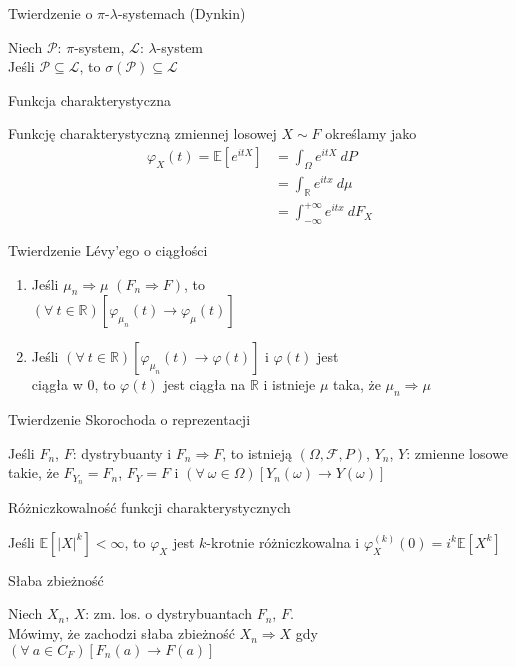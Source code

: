 \documentclass[avery5371,grid,frame]{flashcards}
\begin{document}
\begin{flashcard}[Twierdzenie]{Twierdzenie o $\pi$-$\lambda$-systemach (Dynkin)}

\smallskip
Niech $\mathcal{P}$: $\pi$-system, $\mathcal{L}$: $\lambda$-system \\
Jeśli $\mathcal{P} \subseteq \mathcal{L}$, to $\sigma(\mathcal{P}) \subseteq \mathcal{L}$
\end{flashcard}

\begin{flashcard}[Definicja]{Funkcja charakterystyczna}

\smallskip
Funkcję charakterystyczną zmiennej losowej $X \sim F$ określamy jako
{\begin{align*}
\varphi_X(t) = \mathbb{E} \left[ e^{itX} \right] &= \int_{\Omega} e^{itX} \ dP \\
             &= \int_{\mathbb{R}} e^{itx} \ d \mu \\
             &= \int_{-\infty}^{+\infty} e^{itx} \ dF_X 
\end{align*}}
\end{flashcard}

\begin{flashcard}[Twierdzenie]{Twierdzenie Lévy'ego o ciągłości}

\smallskip
\begin{enumerate}
\item Jeśli $\mu_n \Rightarrow \mu$ $(F_n \Rightarrow F)$, to \\ 
$(\forall \ t \in \mathbb{R})\left[\varphi_{\mu_n}(t) \rightarrow \varphi_\mu(t) \right]$
\item Jeśli $(\forall \ t \in \mathbb{R})\left[\varphi_{\mu_n}(t) \rightarrow \varphi(t) \right]$ i $\varphi(t)$ jest \\ ciągła w $0$, to $\varphi(t)$ jest ciągła na $\mathbb{R}$ i istnieje $\mu$ taka, że $\mu_n \Rightarrow \mu$
\end{enumerate}
\end{flashcard}

\begin{flashcard}[Twierdzenie]{Twierdzenie Skorochoda o reprezentacji}

\smallskip
Jeśli $F_n$, $F$: dystrybuanty i $F_n \Rightarrow F$, to istnieją $\left( \Omega, \mathcal{F}, P \right)$, $Y_n$, $Y$: zmienne losowe takie, że $F_{Y_n} = F_n$, $F_Y=F$ i $(\forall \ \omega \in \Omega)[Y_n(\omega) \rightarrow Y(\omega)]$
\end{flashcard}

\begin{flashcard}[Twierdzenie]{Różniczkowalność funkcji charakterystycznych}

\smallskip
Jeśli $\mathbb{E} \left[ |X|^k \right] < \infty$, to $\varphi_X$ jest $k$-krotnie różniczkowalna i $\varphi^{(k)}_X(0) = i^k \mathbb{E}[X^k]$
\end{flashcard}

\begin{flashcard}[Definicja]{Słaba zbieżność}

\smallskip
Niech $X_n$, $X$: zm. los. o dystrybuantach $F_n$, $F$. \\
Mówimy, że zachodzi słaba zbieżność $X_n \Rightarrow X$ gdy $\left( \forall \ a \in C_F \right) \left[ F_n(a) \rightarrow F(a) \right]$
\end{flashcard}
\end{document}
